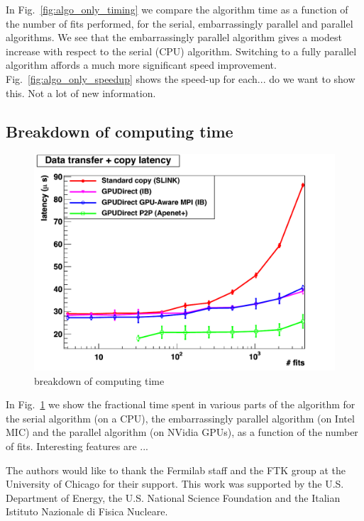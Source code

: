 \documentclass[letterpaper]{jpconf}
\begin{document}
In Fig.~\ref{fig:algo_only_timing} we compare the algorithm time as a
function of the number of fits performed, for the serial,
embarrassingly parallel and parallel algorithms. We see that the
embarrassingly parallel algorithm gives a modest increase with respect
to the serial (CPU) algorithm. Switching to a fully parallel algorithm
affords a much more significant speed
improvement. Fig.~\ref{fig:algo_only_speedup} shows the speed-up for
each... do we want to show this. Not a lot of new information.

\subsection{Breakdown of computing time}
\begin{figure}[tbp]
  \centering
  \includegraphics[width=0.9\linewidth]{../../2012/figures/DT_MC_SLINK_IB_APE_low}
  \caption{breakdown of computing time}
  \label{fig:breakdown}
\end{figure}
In Fig.~\ref{fig:breakdown} we show the fractional time spent in
various parts of the algorithm for the serial algorithm (on a CPU),
the embarrassingly parallel algorithm (on Intel MIC) and the parallel
algorithm (on NVidia GPUs), as a function of the number of
fits. Interesting features are ...

\ack
The authors would like to thank the Fermilab staff and the FTK group at the 
University of Chicago for their support. This work was supported by the
U.S. Department of Energy, the U.S. National Science Foundation and the Italian
Istituto Nazionale di Fisica Nucleare. 






 
\end{document}
